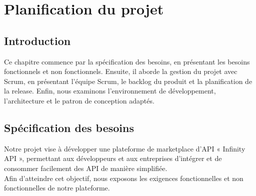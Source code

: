\chapter{Planification du projet}

\section*{Introduction}
Ce chapitre commence par la spécification des besoins, en présentant les besoins fonctionnels et non fonctionnels. Ensuite, il aborde la gestion du projet avec Scrum, en présentant l'équipe Scrum, le backlog du produit et la planification de la release. Enfin, nous examinons l'environnement de développement, l'architecture et le patron de conception adaptés.

\section{Spécification des besoins}

Notre projet vise à développer une plateforme de marketplace d'API « Infinity API », permettant aux développeurs et aux entreprises d'intégrer et de consommer facilement des API de manière simplifiée. \\
Afin d'atteindre cet objectif, nous exposons les exigences fonctionnelles et non fonctionnelles de notre plateforme.


